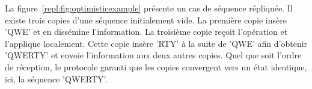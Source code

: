 La figure~\ref{repl:fig:optimisticexample} présente un cas de séquence
répliquée.  Il existe trois copies d'une séquence initialement vide. La première
copie insère 'QWE' et en dissémine l'information. La troisième copie reçoit
l'opération et l'applique localement. Cette copie insère 'RTY' à la suite de
'QWE' afin d'obtenir 'QWERTY' et envoie l'information aux deux autres
copies. Quel que soit l'ordre de réception, le protocole garanti que les copies
convergent vers un état identique, ici, la séquence 'QWERTY'.


